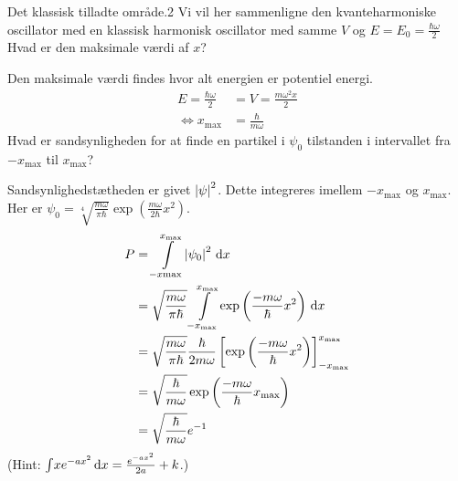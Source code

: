 \begin{opgave}{Det klassisk tilladte område.}{2}
Vi vil her sammenligne den kvanteharmoniske oscillator med en klassisk harmonisk oscillator med samme $V$ og $E=E_0=\frac{\hbar\omega}{2}$
\opg Hvad er den maksimale værdi af $x$?

Den maksimale værdi findes hvor alt energien er potentiel energi.
\begin{align*}
    E=\frac{\hbar\omega}{2}&=V=\frac{m\omega^2x}{2}\\
    \iff x_\text{max} &= \frac{\hbar}{m\omega}
\end{align*}
\opg
Hvad er sandsynligheden for at finde en partikel i $\psi_0$ tilstanden i intervallet fra $-x_\text{max}$ til $x_\text{max}$?

Sandsynlighedstætheden er givet $\abs \psi^2$. Dette integreres imellem $-x_\text{max}$ og $x_\text{max}$.
Her er $\psi_0 = \sqrt[4]{\frac{m\omega}{\pi\hbar}}\exp\left(\frac{m\omega}{2\hbar} x^2\right)$.
\begin{align*}
    P &= \integral{\abs{\psi_0}^2}{x}{-x\text{max}}{x_\text{max}}\\
    &= \sqrt{\frac{m\omega}{\pi\hbar}}\integral{\exp\left(\frac{-m\omega}{\hbar}x^2\right)}{x}{-x_\text{max}}{x_\text{max}}\\
    &= \sqrt{\frac{m\omega}{\pi\hbar}}\frac{\hbar}{2m\omega}\left[\exp\left(\frac{-m\omega}{\hbar}x^2\right)\right]_{-x_\text{max}}^{x_\text{max}}\\
    &=\sqrt{\frac{\hbar}{m\omega}}\exp\left(\frac{-m\omega}{\hbar}x_\text{max}\right)\\
    &=\sqrt{\frac{\hbar}{m\omega}}e^{-1}
\end{align*}
(Hint: $\integral{xe^{-ax^2}}{x}{}{} = \frac{e^{-ax^2}}{2a}+k$.)
\end{opgave}

